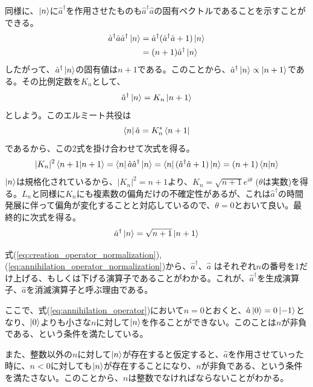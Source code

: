 同様に、$\ket n$に$\hat a ^\dagger$を作用させたものも$\hat a^\dagger \hat a$の固有ベクトルであることを示すことができる。
\begin{equation}
	\begin{aligned}
		\hat a^\dagger \hat a \hat a^\dagger \ket n &= \hat a ^\dagger (\hat a^\dagger \hat a + 1) \ket n\\
		&= (n + 1)\hat a^\dagger\ket n
	\end{aligned}
\end{equation}
したがって、$\hat a^\dagger \ket n$の固有値は$n + 1$である。このことから、$\hat a^\dagger \ket n \propto \ket {n + 1}$である。その比例定数を$K_n$として、
\begin{equation}
  \hat a^\dagger \ket n = K_n\ket{n+1}
\end{equation}
としよう。このエルミート共役は
\begin{equation}
  \bra n \hat a = K_n^*\bra{n+1}
\end{equation}
であるから、この2式を掛け合わせて次式を得る。
\begin{equation}
  |K_n|^2\braket{n+1|n+1} = \bra n \hat a\hat a^\dagger \ket n = \bra n (\hat a^\dagger \hat a + 1) \ket n = (n + 1) \braket{n|n}
\end{equation}
$\ket n$は規格化されているから、$|K_n|^2 = n + 1$より、$K_n = \sqrt {n+1} e^{i\theta}$ ($\theta$は実数)を得る。$L_n$と同様に$K_n$にも複素数の偏角だけの不確定性があるが、これは$\hat a^\dagger$の時間発展に伴って偏角が変化することと対応しているので、$\theta = 0$とおいて良い。最終的に次式を得る。
\begin{equation}
  \hat a^\dagger \ket n = \sqrt {n + 1} \ket {n + 1}
    \label{eq:creation_operator_normalization}
\end{equation}

式(\ref{eq:creation_operator_normalization}), (\ref{eq:annihilation_operator_normalization})から、$\hat a^\dagger$、$\hat a$ はそれぞれ$n$の番号を1だけ上げる、もしくは下げる演算子であることがわかる。これが、$\hat a^\dagger$を生成演算子、$\hat a$を消滅演算子と呼ぶ理由である。

ここで、式(\ref{eq:annihilation_operator})において$n = 0$とおくと、$\hat a\ket 0 = 0 \ket {-1}$となり、$\ket 0$よりも小さな$n$に対して$\ket n$を作ることができない。このことは$n$が非負である、という条件を満たしている。

また、整数以外の$n$に対して$\ket n$が存在すると仮定すると、$\hat a$を作用させていった時に、$n < 0$に対しても$\ket n$が存在することになり、$n$が非負である、という条件を満たさない。このことから、$n$は整数でなければならないことがわかる。

